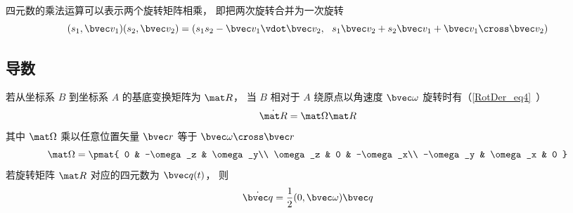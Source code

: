 四元数的乘法运算可以表示两个旋转矩阵相乘， 即把两次旋转合并为一次旋转
\begin{equation}
(s_1, \bvec v_1) (s_2, \bvec v_2) = (s_1 s_2 - \bvec v_1 \vdot \bvec v_2,\ \ s_1 \bvec v_2 + s_2 \bvec v_1 + \bvec v_1 \cross \bvec v_2)
\end{equation}

\subsection{导数}
若从坐标系 $B$ 到坐标系 $A$ 的基底变换矩阵为 $\mat R$， 当 $B$ 相对于 $A$ 绕原点以角速度 $\bvec \omega$ 旋转时有（\autoref{RotDer_eq4}~）
\begin{equation}
\dot{\mat R} = \mat \Omega \mat R
\end{equation}
其中 $\mat\Omega$ 乘以任意位置矢量 $\bvec r$ 等于 $\bvec \omega \cross \bvec r$
\begin{equation}
\mat \Omega = \pmat{
0 & -\omega_z & \omega_y\\
\omega_z & 0 & -\omega_x\\
-\omega_y & \omega_x & 0
}\end{equation}
若旋转矩阵 $\mat R$ 对应的四元数为 $\bvec q(t)$， 则
\begin{equation}\label{QuatN_eq1}
\dot {\bvec q} = \frac12 (0, \bvec \omega) \bvec q
\end{equation}

